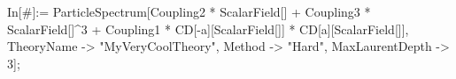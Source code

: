 In[#]:= ParticleSpectrum[Coupling2 * ScalarField[] + Coupling3 * ScalarField[]^3 + Coupling1 * CD[-a][ScalarField[]] * CD[a][ScalarField[]], TheoryName -> "MyVeryCoolTheory", Method -> "Hard", MaxLaurentDepth -> 3]; 